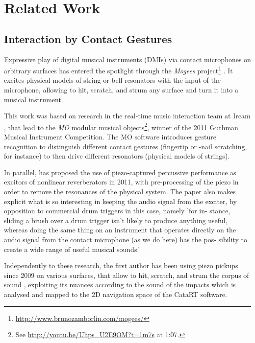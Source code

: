 \section{Related Work}\label{sec:related}

\subsection{Interaction by Contact Gestures}

Expressive play of digital musical instruments (DMIs) via contact microphones on arbitrary surfaces has entered the spotlight through the \textit{Mogees} project\footnote{\url{http://www.brunozamborlin.com/mogees/}}  \cite{Zamborlin14a}.  It excites physical models of string or bell resonators with the input of the microphone, allowing to hit, scratch, and strum any surface and turn it into a musical instrument.  

This work was based on research in the real-time music interaction team at Ircam \cite{Rasamimanana11a,Bevilacqua11b}, that lead to the \textit{MO} modular musical objects\footnote{See \url{http://youtu.be/Uhps_U2E9OM?t=1m7s} at 1:07.}, winner of the 2011 Guthman Musical Instrument Competition.
The MO software introduces gesture recognition to distinguish different contact gestures (fingertip or -nail scratching, for instance) to then drive different resonators (physical models of strings).

In parallel, \cite{PUCKETTE} has proposed the use of piezo-captured percussive performance as excitors of nonlinear reverberators in 2011, with pre-processing of the piezo in order to remove the resonances of the physical system. The paper also makes explicit what is so interesting in keeping the audio signal from the exciter, by opposition to commercial drum triggers in this case, namely 'for in- stance, sliding a brush over a drum trigger isn’t likely to produce anything useful, whereas doing the same thing on an instrument that operates directly on the audio signal from the contact microphone (as we do here) has the pos- sibility to create a wide range of useful musical sounds.'

Independently to these research, the first author has been using piezo pickups since 2009 on various surfaces, that allow to hit, scratch, and strum the corpus of sound \cite{Schwarz-nime2012-sound-space}, exploiting
its nuances according to the sound of the impacts which is analysed and mapped to
the 2D navigation space of the CataRT software.

